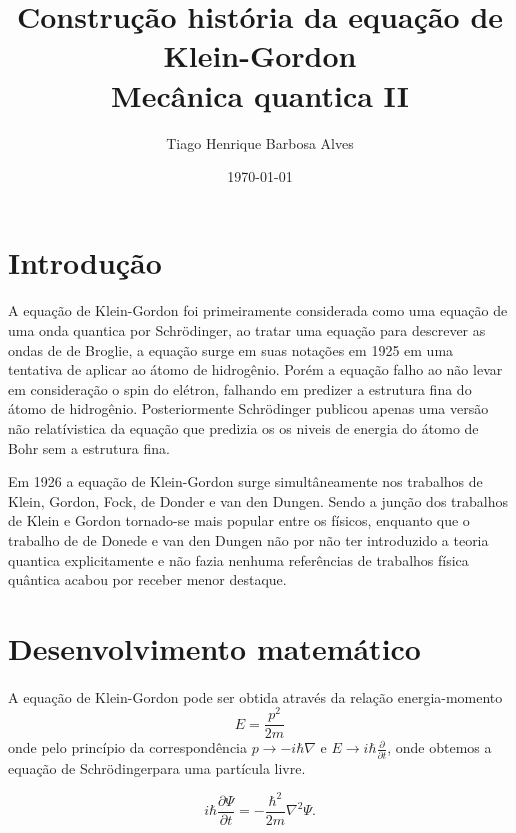 \documentclass[a4paper,14pt]{extarticle}
\title{Construção história da equação de Klein-Gordon\\ Mecânica quantica II}%
\author{Tiago Henrique Barbosa Alves}
\date{\today}
\begin{document}
\maketitle


\section{Introdução}

\paragraph{} A equação de Klein-Gordon foi primeiramente considerada como uma equação de uma
onda quantica por Schrödinger, ao 
tratar uma equação para descrever as ondas de de Broglie, a equação surge em suas notações em 1925 em uma tentativa 
de aplicar ao átomo de hidrogênio. Porém a equação falho ao não levar em consideração o spin do elétron,
falhando em predizer a estrutura fina do átomo de hidrogênio. Posteriormente Schrödinger publicou apenas uma versão não 
relatívistica da equação que predizia os os niveis de energia do átomo de Bohr sem a estrutura fina.\cite{Kragh1984}

Em 1926 a equação de Klein-Gordon surge simultâneamente nos trabalhos de Klein\cite{Klein:1926fj},
Gordon\cite{Gordon1926}, Fock, de Donder e van den Dungen\cite{deDonder1926}. Sendo a junção dos trabalhos de Klein e Gordon tornado-se mais
popular entre os físicos, enquanto que o trabalho de de Donede e van den Dungen não por não ter introduzido 
a teoria quantica explicitamente e não fazia nenhuma referências de trabalhos física quântica acabou por receber menor destaque.


\section{Desenvolvimento matemático}

\paragraph{} A equação de Klein-Gordon pode ser obtida através da relação energia-momento
\begin{equation}
  E=\frac{p^2}{2m} 
\end{equation}
onde pelo princípio da correspondência $p\rightarrow -i \hbar \nabla $ e $E \rightarrow i \hbar \frac{\partial}{\partial t}$, onde 
obtemos a equação de Schrödingerpara uma partícula livre.

\begin{equation}
  i\hbar \frac{\partial \Psi}{\partial t} = -\frac{\hbar ^2}{2m} \nabla^2 \Psi .
\end{equation}
\end{document}
